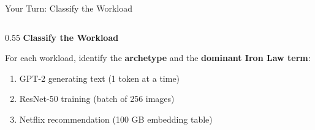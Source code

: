 \documentclass[aspectratio=169, 12pt]{beamer}
\begin{document}
\begin{frame}{Your Turn: Classify the Workload}
\note{
%
%
%
%
%
}

\small
\begin{columns}[T]
  \begin{column}{0.55\textwidth}
    {\normalsize\bfseries Classify the Workload}

    \vspace{0.2cm}
    For each workload, identify the \textbf{archetype} and the \textbf{dominant Iron Law term}:

    \vspace{0.15cm}
    \begin{enumerate}\setlength\itemsep{3pt}
      \item GPT-2 generating text (1 token at a time)
      \item ResNet-50 training (batch of 256 images)
      \item Netflix recommendation (100 GB embedding table)
    \end{enumerate}


\end{column}
\end{columns}
\end{frame}
\end{document}
